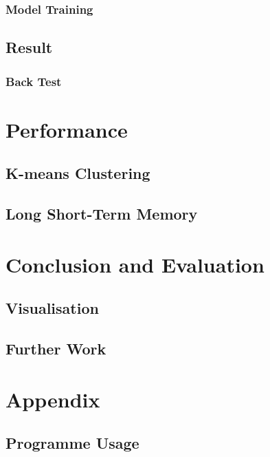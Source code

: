 \documentclass[11pt]{article} %
\theoremstyle{plain}
\theoremstyle{definition}
\begin{document}
\subsubsection{Model Training}
\subsection{Result}
\subsubsection{Back Test}

\section{Performance}
\subsection{K-means Clustering}
\subsection{Long Short-Term Memory}

\section{Conclusion and Evaluation}
\subsection{Visualisation}
\subsection{Further Work}

\section{Appendix}
\subsection{Programme Usage}



\end{document}
